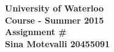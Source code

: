 \documentclass[12pt]{article}
\begin{document}
\begin{center}
  {\Large\bf University of Waterloo}\\
  \vspace{3mm}
         {\Large\bf Course - Summer 2015}\\
         \vspace{2mm}
                {\Large\bf Assignment #}\\
                \vspace{3mm}
                \textbf{Sina Motevalli 20455091}
\end{center}
\end{document}
